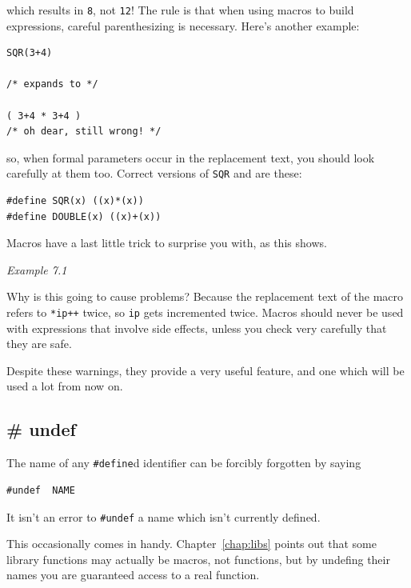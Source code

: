     which results in \texttt{8}, not \texttt{12}! The rule is
     that when using macros to build expressions, careful parenthesizing is
     necessary. Here's another example:


    \begin{Verbatim}
SQR(3+4)

/* expands to */

( 3+4 * 3+4 )
/* oh dear, still wrong! */
\end{Verbatim}

    so, when formal parameters occur in the replacement text, you should
     look carefully at them too. Correct versions of \texttt{SQR} and
     \double{} are these:


    \begin{Verbatim}
#define SQR(x) ((x)*(x))
#define DOUBLE(x) ((x)+(x))
\end{Verbatim}

    Macros have a last little trick to surprise you with, as this
     shows.


    \begin{center}\textit{Example 7.1}\end{center}


    Why is this going to cause problems? Because the replacement text of
     the macro refers to \texttt{*ip++} twice, so \texttt{ip} gets
     incremented twice. Macros should never be used with expressions that
     involve side effects, unless you check very carefully that they are
     safe.


    Despite these warnings, they provide a very useful feature, and one
     which will be used a lot from now on.


   

  

  \subsection{\# undef}
   

   The name of any \texttt{\#define}d identifier can be forcibly
    forgotten by saying


   \begin{Verbatim}
#undef  NAME
\end{Verbatim}

   It isn't an error to \texttt{\#undef} a name which isn't currently
    defined.


   This occasionally comes in handy. Chapter~\ref{chap:libs} points out
    that some library functions may actually be macros, not functions, but
    by undefing their names you are guaranteed access to a real
    function.


